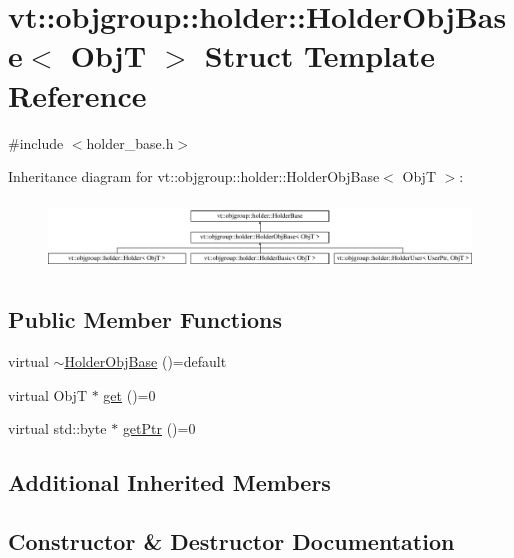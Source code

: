 \hypertarget{structvt_1_1objgroup_1_1holder_1_1_holder_obj_base}{}\section{vt\+:\+:objgroup\+:\+:holder\+:\+:Holder\+Obj\+Base$<$ ObjT $>$ Struct Template Reference}
\label{structvt_1_1objgroup_1_1holder_1_1_holder_obj_base}


{\ttfamily \#include $<$holder\+\_\+base.\+h$>$}

Inheritance diagram for vt\+:\+:objgroup\+:\+:holder\+:\+:Holder\+Obj\+Base$<$ ObjT $>$\+:\begin{figure}[H]
\begin{center}
\leavevmode
\includegraphics[height=1.866667cm]{structvt_1_1objgroup_1_1holder_1_1_holder_obj_base}
\end{center}
\end{figure}
\subsection*{Public Member Functions}
\begin{DoxyCompactItemize}
\item 
virtual \hyperlink{structvt_1_1objgroup_1_1holder_1_1_holder_obj_base_a368d2b1e12c87f11475ecf13dcb66129}{$\sim$\+Holder\+Obj\+Base} ()=default
\item 
virtual ObjT $\ast$ \hyperlink{structvt_1_1objgroup_1_1holder_1_1_holder_obj_base_a4b350b0126259d31a62fd426a08f6698}{get} ()=0
\item 
virtual std\+::byte $\ast$ \hyperlink{structvt_1_1objgroup_1_1holder_1_1_holder_obj_base_adbb4d702b76306f185e29388961e1e2d}{get\+Ptr} ()=0
\end{DoxyCompactItemize}
\subsection*{Additional Inherited Members}


\subsection{Constructor \& Destructor Documentation}
\mbox{\label{structvt_1_1objgroup_1_1holder_1_1_holder_obj_base_a368d2b1e12c87f11475ecf13dcb66129}} 
